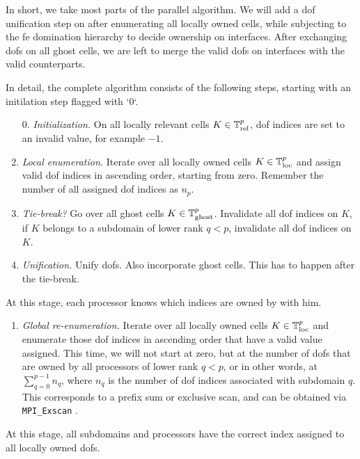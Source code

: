 In short, we take most parts of the parallel algorithm. We will add a \gls{dof} unification step on after enumerating all locally owned cells, while subjecting to the fe domination hierarchy to decide ownership on interfaces. After exchanging \glspl{dof} on all ghost cells, we are left to merge the valid \glspl{dof} on interfaces with the valid counterparts.

In detail, the complete algorithm consists of the following steps, starting with an initilation step flagged with `0`.
\begin{enumerate}
  \item[0.] \textit{Initialization.}
  On all locally relevant cells $K \in \mathbb{T}^p_{\text{rel}}$, \gls{dof} indices are set to an invalid value, for example $-1$.
  \item \textit{Local enumeration.}
  Iterate over all locally owned cells $K \in \mathbb{T}^p_{\text{loc}}$ and assign valid \gls{dof} indices in ascending order, starting from zero. Remember the number of all assigned \gls{dof} indices as $n_p$.
  \item \textit{Tie-break?}
  Go over all ghost cells $K \in \mathbb{T}^p_{\text{ghost}}$. Invalidate all \gls{dof} indices on $K$, if $K$ belongs to a subdomain of lower rank $q < p$, invalidate all \gls{dof} indices on $K$.
  \item \textit{Unification.}
  Unify \glspl{dof}. Also incorporate ghost cells. This has to happen after the tie-break.
\end{enumerate}
At this stage, each processor knows which indices are owned by with him.
\begin{enumerate}[resume]
  \item \textit{Global re-enumeration.}
  Iterate over all locally owned cells $K \in \mathbb{T}^p_{\text{loc}}$
  and enumerate those \gls{dof} indices in ascending order that have a valid value assigned. This time, we will not start at zero, but at the number of \glspl{dof} that are owned by all processors of lower rank $q < p$, or in other words, at $\sum_{q=0}^{p-1} n_q$, where $n_q$ is the number of \gls{dof} indices associated with subdomain $q$. This corresponds to a prefix sum or exclusive scan, and can be obtained via \texttt{MPI\_Exscan} \parencite{mpi31}.
\end{enumerate}
At this stage, all subdomains and processors have the correct index assigned to all locally owned \glspl{dof}.
